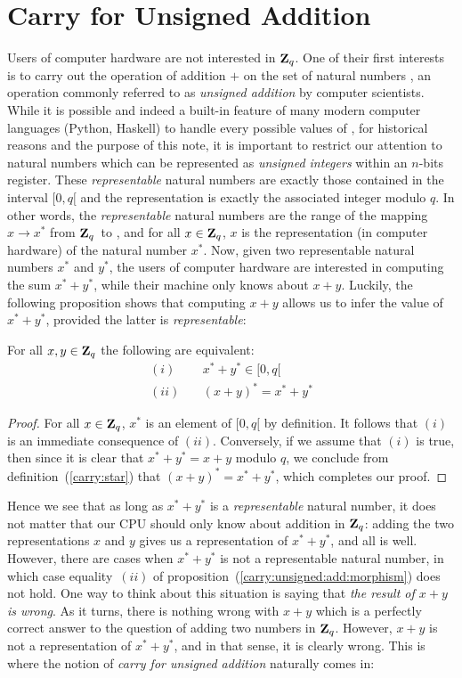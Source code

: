 \documentclass{article}
\newcommand{\zq}{\mbox{${\bf Z}_{q}$}}
\begin{document}
\section{Carry for Unsigned Addition}
Users of computer hardware are not interested in \zq. One of their first interests
is to carry out the operation of addition $+$ on the set of natural numbers \N, 
an operation commonly referred to as {\em unsigned addition} by computer 
scientists. While it is possible and indeed a built-in feature of many modern 
computer languages (Python, Haskell) to handle every possible values of \N,
for historical reasons and the purpose of this note, it is important to restrict
our attention to natural numbers which can be represented as 
{\em unsigned integers} within an $n$-bits register. These {\em representable}
natural numbers are exactly those contained in the interval $[0,q[$ and the
representation is exactly the associated integer modulo $q$. In other words,
the {\em representable} natural numbers are the range of the mapping 
$x\rightarrow x^{*}$ from \zq\ to \N, and for all $x\in\zq$, $x$ is the
representation (in computer hardware) of the natural number $x^{*}$. Now,
given two representable natural numbers $x^{*}$ and $y^{*}$, the users of 
computer hardware are interested in computing the sum $x^{*} + y^{*}$, while their machine only knows about $x+y$. Luckily, the following proposition shows that
computing $x+y$ allows us to infer the value of $x^{*}+y^{*}$, provided the 
latter is {\em representable}:

\begin{prop}\label{carry:unsigned:add:morphism}
For all $x,y\in\zq$ the following are equivalent:
  \begin{eqnarray*}
    (i)&\ &x^{*} + y^{*}\in [0,q[\\
    (ii)&\ &(x + y)^{*} = x^{*} + y^{*} 
  \end{eqnarray*}
\end{prop}
\begin{proof}
  For all $x\in\zq$, $x^{*}$ is an element of $[0,q[$ by definition. It follows
  that $(i)$ is an immediate consequence of $(ii)$. Conversely, if we assume
  that $(i)$ is true, then since it is clear that $x^{*} + y^{*} = x + y$
  modulo $q$, we conclude from definition~(\ref{carry:star}) that 
  $(x+y)^{*} = x^{*} + y^{*}$, which completes our proof.
\end{proof}

Hence we see that as long as $x^{*}+y^{*}$ is a {\em representable} natural
number, it does not matter that our CPU should only know about addition in \zq:
adding the two representations $x$ and $y$ gives us a representation of 
$x^{*}+y^{*}$, and all is well. However, there are cases when $x^{*} + y^{*}$ is
not a representable natural number, in which case equality~$(ii)$ of 
proposition~(\ref{carry:unsigned:add:morphism}) does not hold. One way to
think about this situation is saying that {\em the result of $x+y$ is wrong}.
As it turns, there is nothing wrong with $x+y$ which is a perfectly correct 
answer to the question of adding two numbers in \zq. However, $x+y$ is not a 
representation of $x^{*}+y^{*}$, and in that sense, it is clearly wrong.
This is where the notion of {\em carry for unsigned addition} naturally comes in:
\end{document}
